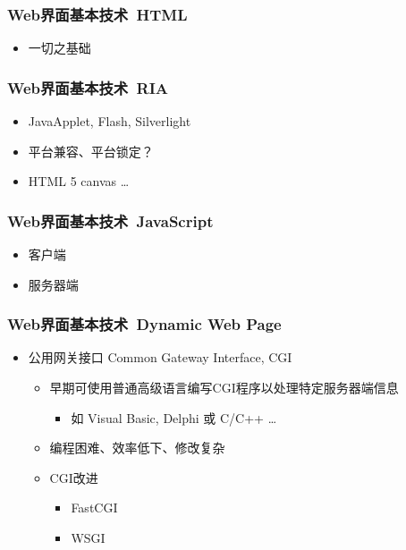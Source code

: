 \documentclass{beamer}
\begin{document}
%

\begin{frame}
	\frametitle{Web界面基本技术~{\small HTML}}
	\beamertemplatetransparentcovereddynamicmedium
	\begin{itemize}[<+->]
		\item 一切之基础
	\end{itemize}
\end{frame}

\begin{frame}
	\frametitle{Web界面基本技术~{\small RIA}}
	\beamertemplatetransparentcovereddynamicmedium
	\begin{itemize}[<+->]
		\item JavaApplet, Flash, Silverlight
		\item 平台兼容、平台锁定？
		\item HTML 5 canvas \dots
	\end{itemize}
\end{frame}

\begin{frame}
	\frametitle{Web界面基本技术~{\small JavaScript}}
	\beamertemplatetransparentcovereddynamicmedium
	\begin{itemize}[<+->]
		\item 客户端
		\item 服务器端
	\end{itemize}
\end{frame}

\begin{frame}
	\frametitle{Web界面基本技术~{\small Dynamic Web Page}}
	\beamertemplatetransparentcovereddynamicmedium
	\begin{itemize}[<+->]
		\item 公用网关接口 Common Gateway Interface, CGI
		\begin{itemize}
			\item 早期可使用普通高级语言编写CGI程序以处理特定服务器端信息
			\begin{itemize}
				\item 如 Visual Basic, Delphi 或 C/C++ \dots
			\end{itemize}
			\item 编程困难、效率低下、修改复杂
			\item CGI改进
			\begin{itemize}
				\item FastCGI
				\item WSGI
			\end{itemize}
		\end{itemize}
	\end{itemize}
\end{frame}
\end{document}
